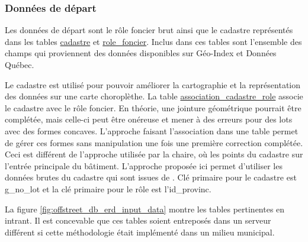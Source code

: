     \subsubsection{Données de départ}Les données de départ sont le rôle foncier brut ainsi que le cadastre représentés dans les tables \underline{cadastre} et \underline{role\_foncier}. Inclus dans ces tables sont l'ensemble des champs qui proviennent des données disponibles sur Géo-Index et Données Québec. \par
    Le cadastre est utilisé pour pouvoir améliorer la cartographie et la représentation des données sur une carte choroplèthe. La table \underline{association\_cadastre\_role} associe le cadastre avec le rôle foncier. En théorie, une jointure géométrique pourrait être complétée, mais celle-ci peut être onéreuse et mener à des erreurs pour des lots avec des formes concaves. L'approche faisant l'association dans une table permet de gérer ces formes sans manipulation une fois une première correction complétée. Ceci est différent de l'approche utilisée par la chaire, où les points du cadastre sur l'entrée principale du bâtiment. L'approche proposée ici permet d'utiliser les données brutes du cadastre qui sont issues de \textcite{GouvernementduQuebec:ManuelEvaluation:2024}. Clé primaire pour le cadastre est g\_no\_lot et la clé primaire pour le rôle est l'id\_provinc.\par
    La figure \ref{fig:offstreet_db_erd_input_data} montre les tables pertinentes en intrant. Il est concevable que ces tables soient entreposés dans un serveur différent si cette méthodologie était implémenté dans un milieu municipal.
